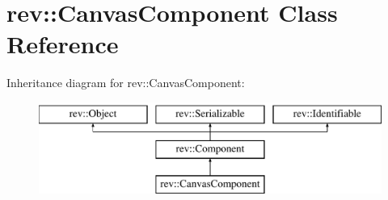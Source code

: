 \hypertarget{classrev_1_1_canvas_component}{}\section{rev\+::Canvas\+Component Class Reference}
\label{classrev_1_1_canvas_component}
Inheritance diagram for rev\+::Canvas\+Component\+:\begin{figure}[H]
\begin{center}
\leavevmode
\includegraphics[height=3.000000cm]{classrev_1_1_canvas_component}
\end{center}
\end{figure}
